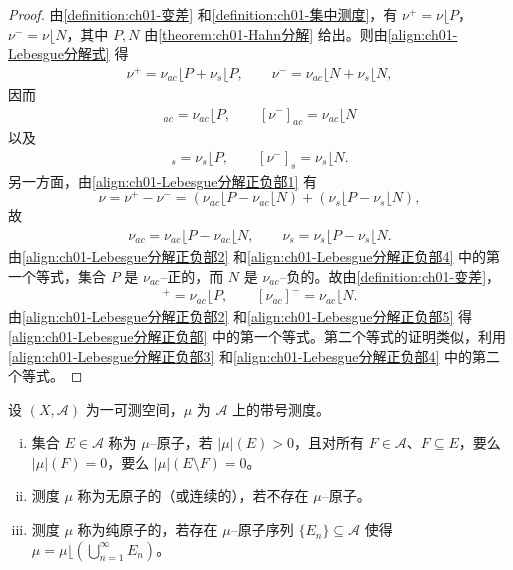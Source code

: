 \documentclass[../../main.tex]{subfiles}%
\begin{document}
\begin{proof}
由\cref{definition:ch01-变差} 和\cref{definition:ch01-集中测度}，有 $\nu^+=\nu\lfloor P$，$\nu^-=\nu\lfloor N$，其中 $P,N$ 由\cref{theorem:ch01-Hahn分解} 给出。则由\eqref{align:ch01-Lebesgue分解式} 得
\begin{align}
\nu^+=\nu_{ac}\lfloor P+\nu_s\lfloor P,\qquad
\nu^-=\nu_{ac}\lfloor N+\nu_s\lfloor N, \label{align:ch01-Lebesgue分解正负部1}
\end{align}
因而
\begin{align}
[\nu^+]_{ac}=\nu_{ac}\lfloor P,\qquad [\nu^-]_{ac}=\nu_{ac}\lfloor N \label{align:ch01-Lebesgue分解正负部2}
\end{align}
以及
\begin{align}
[\nu^+]_s=\nu_s\lfloor P,\qquad [\nu^-]_s=\nu_s\lfloor N. \label{align:ch01-Lebesgue分解正负部3}
\end{align}
另一方面，由\eqref{align:ch01-Lebesgue分解正负部1} 有
\[
\nu=\nu^+-\nu^-=(\nu_{ac}\lfloor P-\nu_{ac}\lfloor N)+(\nu_s\lfloor P-\nu_s\lfloor N),
\]
故
\begin{align}
\nu_{ac}=\nu_{ac}\lfloor P-\nu_{ac}\lfloor N,\qquad
\nu_s=\nu_s\lfloor P-\nu_s\lfloor N. \label{align:ch01-Lebesgue分解正负部4}
\end{align}
由\eqref{align:ch01-Lebesgue分解正负部2} 和\eqref{align:ch01-Lebesgue分解正负部4} 中的第一个等式，集合 $P$ 是 $\nu_{ac}$--正的，而 $N$ 是 $\nu_{ac}$--负的。故由\cref{definition:ch01-变差}，
\begin{align}
[\nu_{ac}]^+=\nu_{ac}\lfloor P,\qquad [\nu_{ac}]^-=\nu_{ac}\lfloor N. \label{align:ch01-Lebesgue分解正负部5}
\end{align}
由\eqref{align:ch01-Lebesgue分解正负部2} 和\eqref{align:ch01-Lebesgue分解正负部5} 得\eqref{align:ch01-Lebesgue分解正负部} 中的第一个等式。第二个等式的证明类似，利用\eqref{align:ch01-Lebesgue分解正负部3} 和\eqref{align:ch01-Lebesgue分解正负部4} 中的第二个等式。
\end{proof}

\begin{definition}\label{definition:ch01-原子}
设 $(X,\mathcal{A})$ 为一可测空间，$\mu$ 为 $\mathcal{A}$ 上的带号测度。
\begin{enumerate}[(i)]
\item 集合 $E\in\mathcal{A}$ 称为 $\mu$--原子，若 $|\mu|(E)>0$，且对所有 $F\in\mathcal{A}$、$F\subseteq E$，要么 $|\mu|(F)=0$，要么 $|\mu|(E\setminus F)=0$。
\item 测度 $\mu$ 称为无原子的（或连续的），若不存在 $\mu$--原子。
\item 测度 $\mu$ 称为纯原子的，若存在 $\mu$--原子序列 $\{E_n\}\subseteq\mathcal{A}$ 使得 $\mu=\mu\lfloor\left(\bigcup_{n=1}^\infty E_n\right)$。
\end{enumerate}
\end{definition}
\end{document}
